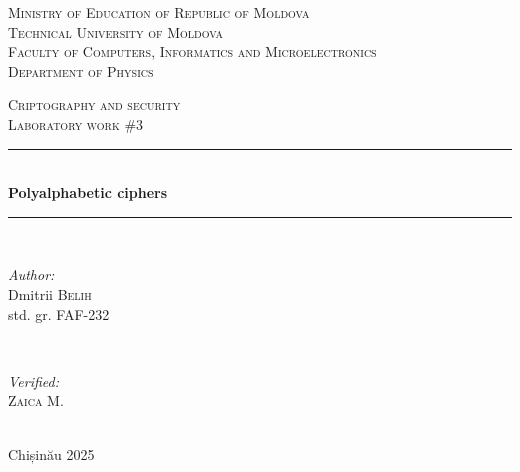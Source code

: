 \documentclass[12pt]{article}
\begin{document}
\begin{titlepage}
   \begin{center}
    \textsc{\large Ministry of Education of Republic of Moldova}\\[0.5cm]
    \textsc{\large Technical University of Moldova}\\[0.5cm]
    \textsc{\large Faculty of Computers, Informatics and Microelectronics}\\[0.5cm]
    \textsc{\large Department of Physics}\\[1.2cm]
    
    \vspace{25 mm}
    
    \textsc{\Large Criptography and security}\\[0.5cm]
    \textsc{\large Laboratory work \#3}\\[0.5cm]    %
    
    \newcommand{\HRule}{\rule{\linewidth}{0.5mm}}
    \vspace{10 mm}
    \HRule \\[0.4cm]
    { \LARGE \bfseries Polyalphabetic ciphers}\\[0.4cm] %
    \HRule \\[1.5cm]
    
    \vspace{10mm}
    
    \begin{minipage}[t]{0.4\textwidth}
    \begin{flushleft} \large
    \emph{Author:} \\
    Dmitrii \textsc{Belih}\\                         %
    std. gr. FAF-232                                %
    \end{flushleft}
    \end{minipage}
    ~
    \begin{minipage}[t]{0.4\textwidth}
    \begin{flushright} \large
    \emph{Verified:} \\
    \textsc{Zaica} M.\\
    \end{flushright}
    \end{minipage}\\[3cm]
    
    \vspace{5 mm}
    \large Chișinău 2025\\[0.5cm]
    
    \vfill
    \end{center}
\end{titlepage}
\end{document}
